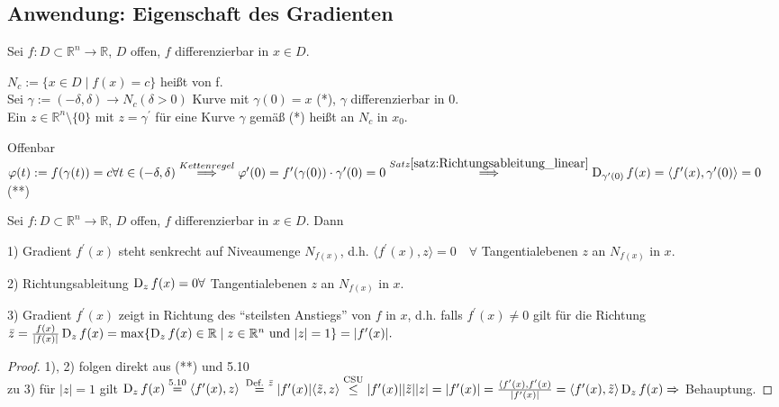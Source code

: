 \subsection{Anwendung: Eigenschaft des Gradienten}

Sei $f: D \subset \mathbb{R}^n \to \mathbb{R}$, $D$ offen, $f$ differenzierbar in $x\in D$.\\

\begin{definition}
    $N_c := \{x \in D \mid f(x) = c\}$  heißt  von f.\\
    Sei $\gamma := (-\delta, \delta) \to N_c(\delta > 0)$ Kurve mit $\gamma(0) = x$ (*), $\gamma$ differenzierbar in $0$.\\
    Ein $z \in \mathbb{R}^n\setminus\{0\}$  mit $z = \gamma^{\prime}$ für eine Kurve $\gamma$ gemäß (*) heißt  an $N_c$ in $x_0$.
\end{definition}

Offenbar $\varphi(t) := f(\gamma(t)) = c \forall t \in (-\delta, \delta)\\ \overset{Kettenregel}{\Longrightarrow} \varphi^{\prime}(0) = f^{\prime}(\gamma(0))\cdot \gamma^{\prime}(0) = 0 \overset{Satz \ref{satz:Richtungsableitung_linear}}{\Longrightarrow} \operatorname{D}_{\gamma^{\prime}(0)}f(x) = \langle f^{\prime}(x),\gamma^{\prime}(0)\rangle =0$ (**)

\begin{satz}
    Sei $f: D \subset \mathbb{R}^n \to \mathbb{R}$, $D$ offen, $f$ differenzierbar in $x \in D$. Dann
    \begin{compactitem}
        \item[1)] Gradient $f^{\prime}(x)$ steht senkrecht auf Niveaumenge $N_{f(x)}$, d.h. $\langle f^{\prime}(x), z\rangle = 0 \quad\forall$ Tangentialebenen $z$ an $N_{f(x)}$ in $x$.
        \item[2)] Richtungsableitung $\operatorname{D}_z f(x) = 0 \forall$ Tangentialebenen $z$ an $N_{f(x)}$ in $x$.
        \item[3)] Gradient $f^{\prime}(x)$ zeigt in Richtung des ``steilsten Anstiegs'' von $f$ in $x$, d.h. falls $f^{\prime}(x) \neq 0$ gilt für die Richtung $\bar{z} = \frac{f(x)}{\vert f(x) \vert} \operatorname{D}_z f(x) = \max\{\operatorname{D}_z f(x) \in \mathbb{R} \mid z \in \mathbb{R}^n \text{ und } \vert z \vert = 1\} = \vert f^{\prime}(x)\vert.$
    \end{compactitem}
\end{satz}

\begin{proof}
    1), 2) folgen direkt aus (**) und 5.10\\
    zu 3) für $\vert z \vert = 1$ gilt $\operatorname{D}_z f(x) \overset{5.10}{=} \langle f^{\prime}(x), z \rangle$ $\overset{\text{Def. } \bar{z}}{=} \vert f^{\prime}(x)\vert \langle \tilde{z}, z\rangle \overset{\text{CSU}}{\leq} \vert f^{\prime}(x)\vert \vert \tilde{z}\vert \vert z\vert = \vert f^{\prime}(x)\vert = \frac{\langle f^{\prime}(x),f^{\prime}(x)}{\vert f^{\prime}(x) \vert} = \langle f^{\prime}(x), \tilde{z}\rangle \operatorname{D}_z f(x) \Rightarrow$ Behauptung. %
\end{proof}